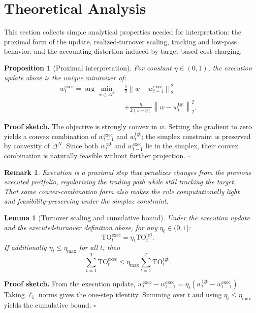 \documentclass[10pt,twocolumn]{article}
\newtheorem{proposition}{Proposition}
\newtheorem{lemma}{Lemma}
\newtheorem{remark}{Remark}
\newcommand{\wexec}{w^{\mathrm{exec}}}
\newcommand{\wtgt}{w^{\mathrm{tgt}}}
\newcommand{\TOexec}{\mathrm{TO}^{\mathrm{exec}}}
\newcommand{\TOtgt}{\mathrm{TO}^{\mathrm{tgt}}}
\newcommand{\normtwo}[1]{\left\lVert #1 \right\rVert_2}
\newcommand{\DeltaN}{\Delta^N}
\begin{document}
\section{Theoretical Analysis}
\label{sec:theory}
This section collects simple analytical properties needed for interpretation: the proximal form of the update, realized-turnover scaling, tracking and low-pass behavior, and the accounting distortion induced by target-based cost charging.

\begin{proposition}[Proximal interpretation]\label{prop:prox}
For constant $\eta\in(0,1)$, the execution update above is the unique minimizer of:
\[
\begin{aligned}
\wexec_t=\arg\min_{w \in \DeltaN}\;
&\frac{1}{2}\normtwo{w-\wexec_{t-1}}^2 \\
&+ \frac{\eta}{2(1-\eta)}\normtwo{w-\wtgt_t}^2.
\end{aligned}
\]
\end{proposition}
\noindent\textbf{Proof sketch.} The objective is strongly convex in $w$. Setting the gradient to zero yields a convex combination of $\wexec_{t-1}$ and $\wtgt_t$; the simplex constraint is preserved by convexity of $\DeltaN$. Since both $\wtgt_t$ and $\wexec_{t-1}$ lie in the simplex, their convex combination is naturally feasible without further projection. \hfill$\square$
\begin{remark}
Execution is a proximal step that penalizes \emph{changes from the previous executed portfolio}, regularizing the trading path while still tracking the target. That same convex-combination form also makes the rule computationally light and feasibility-preserving under the simplex constraint.
\end{remark}

\begin{lemma}[Turnover scaling and cumulative bound]\label{lem:turnover_scaling}
Under the execution update and the executed-turnover definition above, for any $\eta_t\in(0,1]$:
\[
\TOexec_t = \eta_t \TOtgt_t.
\]
If additionally $\eta_t\le \eta_{\max}$ for all $t$, then
\[
\sum_{t=1}^T \TOexec_t \le \eta_{\max}\sum_{t=1}^T \TOtgt_t.
\]
\end{lemma}
\noindent\textbf{Proof sketch.} From the execution update,
$\wexec_t-\wexec_{t-1}=\eta_t(\wtgt_t-\wexec_{t-1})$.
Taking $\ell_1$ norms gives the one-step identity. Summing over $t$ and using $\eta_t\le \eta_{\max}$ yields the cumulative bound. \hfill$\square$
\end{document}
